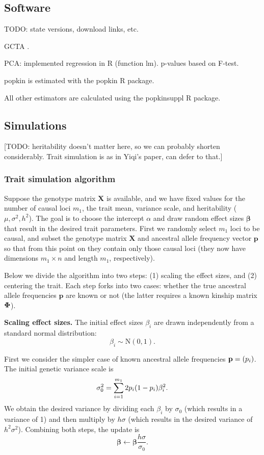 \documentclass[11pt]{article}
\newcommand{\kinMat}{%
  \ensuremath{%
    \mathbf{\Phi}
  }%
  \xspace%
}%
\begin{document}
\subsection{Software}

TODO: state versions, download links, etc.

GCTA \citep{yang_gcta:_2011}.

PCA: implemented regression in R (function lm).
p-values based on F-test.

popkin is estimated with the popkin R package.

All other estimators are calculated using the popkinsuppl R package.


\subsection{Simulations}

[TODO: heritability doesn't matter here, so we can probably shorten considerably.
Trait simulation is as in Yiqi's paper, can defer to that.]

\subsubsection{Trait simulation algorithm}

Suppose the genotype matrix $\mathbf{X}$ is available, and we have fixed values for the number of causal loci $m_1$, the trait mean, variance scale, and heritability ($\mu, \sigma^2, h^2$).
The goal is to choose the intercept $\alpha$ and draw random effect sizes $\mathbf{\beta}$ that result in the desired trait parameters.
First we randomly select $m_1$ loci to be causal, and subset the genotype matrix $\mathbf{X}$ and ancestral allele frequency vector $\mathbf{p}$ so that from this point on they contain only those causal loci (they now have dimensions $m_1 \times n$ and length $m_1$, respectively).

Below we divide the algorithm into two steps: (1) scaling the effect sizes, and (2) centering the trait.
Each step forks into two cases: whether the true ancestral allele frequencies $\mathbf{p}$ are known or not (the latter requires a known kinship matrix $\kinMat$).

\textbf{Scaling effect sizes.}
The initial effect sizes $\beta_i$ are drawn independently from a standard normal distribution:
$$
\beta_i \sim \text{N}(0, 1).
$$

First we consider the simpler case of known ancestral allele frequencies $\mathbf{p} = ( p_i  )$.
The initial genetic variance scale is
$$
\sigma^2_0
=
\sum_{i=1}^{m_1} 2  p_i   (1- p_i  ) \beta_i^2
.
$$
We obtain the desired variance by dividing each $\beta_i$ by $\sigma_0$ (which results in a variance of 1) and then multiply by $h \sigma$ (which results in the desired variance of $h^2 \sigma^2$).
Combining both steps, the update is
$$
\mathbf{\beta}
\leftarrow
\mathbf{\beta} \frac{ h \sigma }{\sigma_0}
.
$$
\end{document}
